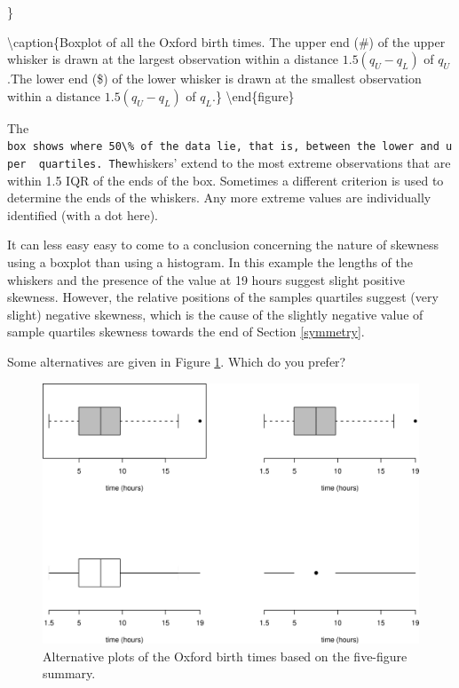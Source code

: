 \documentclass[
  british,
]{book}
\begin{document}
\}

\textbackslash caption\{Boxplot of all the Oxford birth times. The upper end (\#) of the upper whisker is drawn at the largest observation within a distance \(1.5 (q_U-q_L)\) of \(q_U\).The lower end (\$) of the lower whisker is drawn at the smallest observation within a distance \(1.5 (q_U-q_L)\) of \(q_L\).\}\label{fig:oxboxbasic}
\textbackslash end\{figure\}
\FloatBarrier

The \texttt{box\textquotesingle{}\ shows\ where\ 50\textbackslash{}\%\ of\ the\ data\ lie,\ that\ is,\ between\ the\ lower\ and\ uper\ \ quartiles.\ The}whiskers' extend to the most extreme observations that are within 1.5 IQR of the ends of the box. Sometimes a different criterion is used to determine the ends of the whiskers. Any more extreme values are individually identified (with a dot here).

It can less easy easy to come to a conclusion concerning the nature of skewness using a boxplot than using a histogram. In this example the lengths of the whiskers and the presence of the value at 19 hours suggest slight positive skewness. However, the relative positions of the samples quartiles suggest (very slight) negative skewness, which is the cause of the slightly negative value of sample quartiles skewness towards the end of Section \ref{symmetry}.

Some alternatives are given in Figure \ref{fig:oxboxadv}. Which do you prefer?

\begin{figure}

{\centering \includegraphics[width=0.8\linewidth]{images/ox_box_adv} 

}

\caption{Alternative plots of the Oxford birth times based on the five-figure summary.}\label{fig:oxboxadv}
\end{figure}
\FloatBarrier
\end{document}

